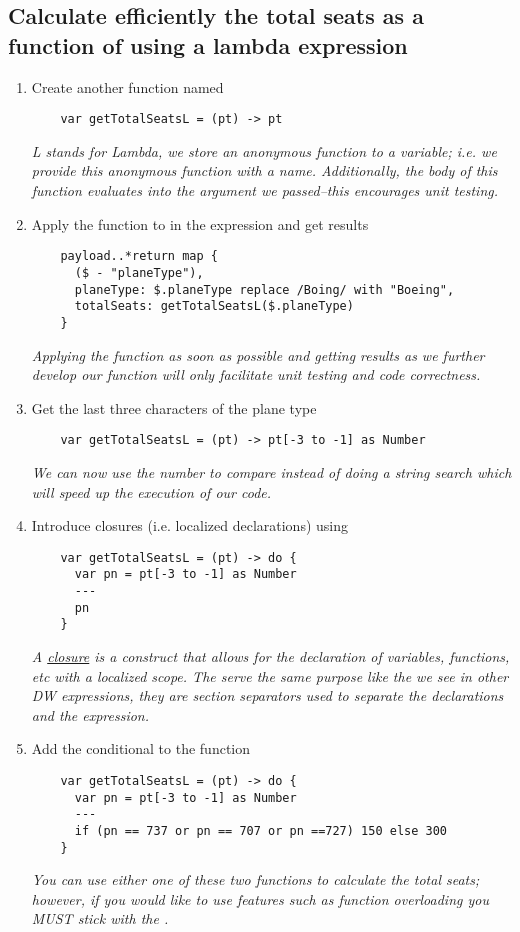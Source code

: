 \subsection{Calculate efficiently the total seats as a function of  using a lambda expression}
\begin{enumerate}[resume*]
\item Create another function named 
  \begin{verbatim}
    var getTotalSeatsL = (pt) -> pt
  \end{verbatim}
  \emph{
    L stands for Lambda, we store an anonymous function to a variable; i.e. we provide this anonymous function
    with a name.  Additionally, the body of this function evaluates into the argument we passed--this encourages
    unit testing.
  }
\item Apply the function to in the expression and get results
  \begin{verbatim}
    payload..*return map {
      ($ - "planeType"),
      planeType: $.planeType replace /Boing/ with "Boeing",
      totalSeats: getTotalSeatsL($.planeType)
    }
  \end{verbatim}
  \emph{
    Applying the function as soon as possible and getting results as we further develop our function
    will only facilitate unit testing and code correctness.
  }
\item Get the last three characters of the plane type
  \begin{verbatim}
    var getTotalSeatsL = (pt) -> pt[-3 to -1] as Number
  \end{verbatim}
  \emph{
    We can now use the number to compare instead of doing a string search which will speed up the execution of
    our code.
  }
\item Introduce closures (i.e. localized declarations) using 
  \begin{verbatim}
    var getTotalSeatsL = (pt) -> do {
      var pn = pt[-3 to -1] as Number
      ---
      pn
    }
  \end{verbatim}
  \emph{
    A \href{https://en.wikipedia.org/wiki/Closure_(computer_programming)}{closure} is a construct that allows for
    the declaration of variables, functions, etc with a localized scope.  The \ttt{---} serve the same purpose
    like the \ttt{---} we see in other DW expressions, they are section separators used to separate the
    declarations and the expression.
  }
\item Add the conditional to the function
  \begin{verbatim}
    var getTotalSeatsL = (pt) -> do {
      var pn = pt[-3 to -1] as Number
      ---
      if (pn == 737 or pn == 707 or pn ==727) 150 else 300
    }    
  \end{verbatim}
  \emph{
    You can use either one of these two functions to calculate the total seats; however, if you would like to use
    features such as function overloading you MUST stick with the .
  }
\end{enumerate}

